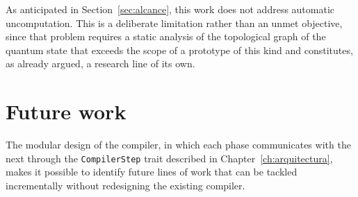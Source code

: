 As anticipated in Section~\ref{sec:alcance}, this work does not address automatic uncomputation. This is a deliberate limitation rather than an unmet objective, since that problem requires a static analysis of the topological graph of the quantum state that exceeds the scope of a prototype of this kind and constitutes, as already argued, a research line of its own.

\section{Future work}

The modular design of the compiler, in which each phase communicates with the next through the \lstinline|CompilerStep| trait described in Chapter~\ref{ch:arquitectura}, makes it possible to identify future lines of work that can be tackled incrementally without redesigning the existing compiler.

